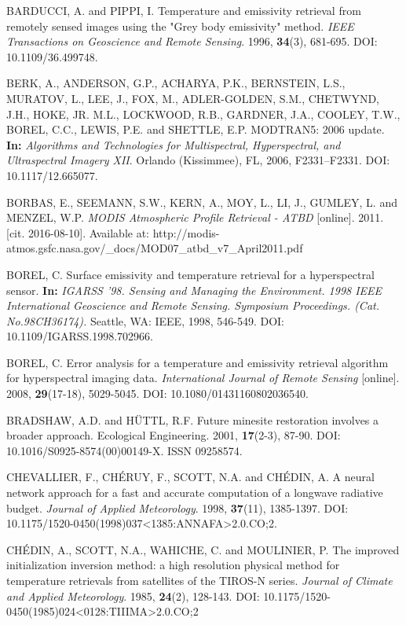 \begin{thebibliography}{10}
 BARDUCCI, A. and PIPPI, I. Temperature and emissivity retrieval from remotely sensed images using the "Grey body emissivity" method. \textit{IEEE Transactions on Geoscience and Remote Sensing}. 1996, \textbf{34}(3), 681-695. DOI: 10.1109/36.499748.

 BERK, A., ANDERSON, G.P., ACHARYA, P.K., BERNSTEIN, L.S., MURATOV, L., LEE, J., FOX, M., ADLER-GOLDEN, S.M., CHETWYND, J.H., HOKE, JR. M.L., LOCKWOOD, R.B., GARDNER, J.A., COOLEY, T.W., BOREL, C.C., LEWIS, P.E. and SHETTLE, E.P. MODTRAN5: 2006 update. \textbf{In:} \textit{Algorithms and Technologies for Multispectral, Hyperspectral, and Ultraspectral Imagery XII}. Orlando (Kissimmee), FL, 2006, F2331--F2331. DOI: 10.1117/12.665077.

 BORBAS, E., SEEMANN, S.W., KERN, A., MOY, L., LI, J., GUMLEY, L. and MENZEL, W.P. \textit{MODIS Atmospheric Profile Retrieval - ATBD} [online]. 2011. [cit. 2016-08-10]. Available at: http://modis-atmos.gsfc.nasa.gov/\_docs/MOD07\_atbd\_v7\linebreak\_April2011.pdf

 BOREL, C. Surface emissivity and temperature retrieval for a hyperspectral sensor. \textbf{In:} \textit{IGARSS '98. Sensing and Managing the Environment. 1998 IEEE International Geoscience and Remote Sensing. Symposium Proceedings. (Cat. No.98CH36174).} Seattle, WA: IEEE, 1998, 546-549. DOI: 10.1109/IGARSS.1998.702966.

 BOREL, C. Error analysis for a temperature and emissivity retrieval algorithm for hyperspectral imaging data. \textit{International Journal of Remote Sensing} [online]. 2008, \textbf{29}(17-18), 5029-5045. DOI: 10.1080/01431160802036540.

 BRADSHAW, A.D. and HÜTTL, R.F. Future minesite restoration involves a broader approach. Ecological Engineering. 2001, \textbf{17}(2-3), 87-90. DOI: 10.1016/S0925-8574(00)00149-X. ISSN 09258574.

 CHEVALLIER, F., CHÉRUY, F., SCOTT, N.A. and CHÉDIN, A. A neural network approach for a fast and accurate computation of a longwave radiative budget. \textit{Journal of Applied Meteorology}. 1998, \textbf{37}(11), 1385-1397. DOI: 10.1175/1520-0450(1998)037<1385:ANNAFA>2.0.CO;2.

 CHÉDIN, A., SCOTT, N.A., WAHICHE, C. and MOULINIER, P. The improved initialization inversion method: a high resolution physical method for temperature retrievals from satellites of the TIROS-N series. \textit{Journal of Climate and Applied Meteorology}. 1985, \textbf{24}(2), 128-143. DOI: 10.1175/1520-0450(1985)024<0128:TIIIMA>2.0.CO;2


\end{thebibliography}
